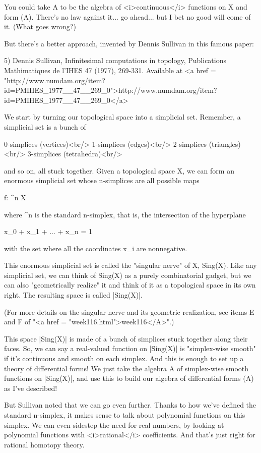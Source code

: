You could take A to be the algebra of <i>continuous</i> functions on X and
form \Omega (A).  There's no law against it... go ahead... but I bet
no good will come of it.  (What goes wrong?)

But there's a better approach, invented by Dennis Sullivan in this
famous paper:

5) Dennis Sullivan, Infinitesimal computations in topology,
Publications Mathimatiques de l'IHES 47 (1977), 269-331.  Available
at <a href = "http://www.numdam.org/item?id=PMIHES_1977__47__269_0">http://www.numdam.org/item?id=PMIHES_1977__47__269_0</a>

We start by turning our topological space into a simplicial set.  
Remember, a simplicial set is a bunch of

0-simplices (vertices)<br/>
1-simplices (edges)<br/>
2-simplices (triangles)<br/>
3-simplices (tetrahedra)<br/>

and so on, all stuck together.  Given a topological space X, we can 
form an enormous simplicial set whose n-simplices are all possible
maps 

f: \Delta ^{n} \to  X

where \Delta ^{n} is the standard n-simplex, that is, the intersection
of the hyperplane 

x_{0} + x_{1} + ... + x_{n} = 1

with the set where all the coordinates x_{i} are nonnegative.

This enormous simplicial set is called the "singular nerve"
of X, Sing(X).  Like any simplicial set, we can think of Sing(X) as a
purely combinatorial gadget, but we can also "geometrically
realize" it and think of it as a topological space in its own
right.  The resulting space is called |Sing(X)|.

(For more details on the singular nerve and its geometric realization,
see items E and F of "<a href = "week116.html">week116</A>".)

This space |Sing(X)| is made of a bunch of simplices stuck together
along their faces.  So, we can say a real-valued function on |Sing(X)|
is "simplex-wise smooth" if it's continuous and smooth on each
simplex.  And this is enough to set up a theory of differential forms!
We just take the algebra A of simplex-wise smooth functions on
|Sing(X)|, and use this to build our algebra of differential forms
\Omega (A) as I've described!

But Sullivan noted that we can go even further.  Thanks to how we've
defined the standard n-simplex, it makes sense to talk about
polynomial functions on this simplex.  We can even sidestep the need
for real numbers, by looking at polynomial functions with <i>rational</i>
coefficients.  And that's just right for rational homotopy theory.

